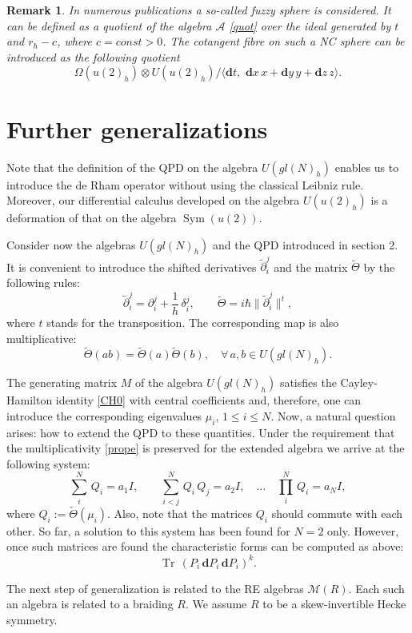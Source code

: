 \documentclass[10pt,a4paper]{amsart}
\newcommand{\pa}{\partial}
\DeclareMathOperator{\Tr}{Tr}
\newcommand{\MM}{\mathcal{M}}
\newcommand{\de}{\delta}
\newcommand{\ot}{\otimes}
\DeclareMathOperator{\Sym}{Sym}
\renewcommand{\AA}{\mathcal{A}}
\newcommand{\UU}{U(gl(N)_h)}
\newcommand{\UUU}{U(u(2)_h)}
\newcommand{\tpa}{\widetilde{\pa}}
\newcommand{\hh}{\hbar}
\newcommand{\tatt}{\widetilde{\Theta}}
\newcommand{\rh}{r_{\hbar}}
\newcommand{\Om}{\Omega}
\newcommand{\dd}{\mathbf{d}}
\numberwithin{equation}{section}
\newtheorem{remark}[theorem]{Remark}
\begin{document}
\begin{remark}
In  numerous publications a so-called fuzzy sphere is considered. It can be defined as a quotient of the algebra $\AA$ \eqref{quot}
	over the ideal generated by $t$ and
	$\rh-c$, where $c=const>0$. The cotangent fibre on such a NC sphere can be introduced as the following quotient
\[
	\Om(u(2)_h)\ot U(u(2)_h)/\langle \dd t,\,\, \dd x\, x+\dd y\, y+\dd z\, z \rangle.
\]
\end{remark}

\section{Further generalizations}\label{sec:generalizations}

Note that the definition of the QPD on the algebra $\UU$ enables us to introduce the de Rham operator without using the classical
Leibniz rule. Moreover, our differential calculus developed on the algebra $\UUU$ is a deformation of that on the algebra $\Sym(u(2))$.

Consider now the algebras $\UU$ and the QPD introduced in section 2. It is convenient to introduce the shifted
derivatives $\tpa_i^j$ and the matrix $\tatt$ by the following rules:
\[
\tpa_i^j=\pa_i^j+\frac{1}{h}\,\de_i^j,\qquad \tatt=i\hh\|\tpa_i^j\|^t,
\]
where $t$ stands for  the transposition. The corresponding map is also multiplicative:
\begin{equation}
\tatt(ab)= \tatt(a)\tatt(b),\quad \forall\, a,b \in \UU.
\label{prope}
\end{equation}

The generating matrix $M$ of the algebra $\UU$ satisfies the Cayley-Hamilton identity \eqref{CH0} with central coefficients and,
therefore, one can introduce the corresponding eigenvalues $\mu_i$, $1\le i\le N$. Now, a natural question arises: how to extend
the QPD to these quantities. Under the requirement that the multiplicativity \eqref{prope} is preserved for the extended algebra we
arrive at the following system:
\[
\sum_i^N\, Q_i=a_1 I,\qquad  \sum_{i<j}^N\, Q_i\, Q_j=a_2 I,\quad \dots\quad  \prod_{i}^N\, Q_i=a_N I,
\]
where $Q_i:=\tatt(\mu_i)$. Also, note that the matrices $Q_i$ should commute with each other. So far, a solution to this system
has been found for $N=2$ only. However, once such matrices are found the characteristic forms can be computed as above:
\[
\Tr\,(P_i\, \dd P_i\, \dd P_i)^k.
\]

The next step of  generalization is related to the RE algebras $\MM(R)$.  Each such an algebra is related to a
braiding $R$. We assume $R$ to be a skew-invertible Hecke symmetry.
\end{document}
